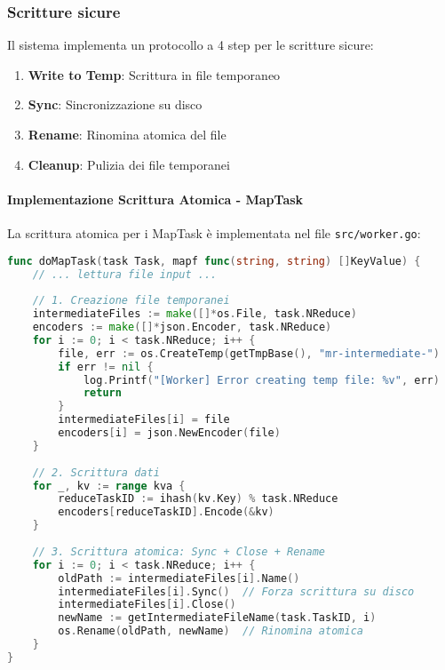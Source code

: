 \documentclass[12pt,a4paper]{article}
\begin{document}
\subsubsection{Scritture sicure}

Il sistema implementa un protocollo a 4 step per le scritture sicure:

\begin{enumerate}
\item \textbf{Write to Temp}: Scrittura in file temporaneo
\item \textbf{Sync}: Sincronizzazione su disco
\item \textbf{Rename}: Rinomina atomica del file
\item \textbf{Cleanup}: Pulizia dei file temporanei
\end{enumerate}

\paragraph{Implementazione Scrittura Atomica - MapTask}

La scrittura atomica per i MapTask è implementata nel file \texttt{src/worker.go}:

\begin{lstlisting}[language=Go, caption=Scrittura atomica MapTask]
func doMapTask(task Task, mapf func(string, string) []KeyValue) {
    // ... lettura file input ...
    
    // 1. Creazione file temporanei
    intermediateFiles := make([]*os.File, task.NReduce)
    encoders := make([]*json.Encoder, task.NReduce)
    for i := 0; i < task.NReduce; i++ {
        file, err := os.CreateTemp(getTmpBase(), "mr-intermediate-")
        if err != nil {
            log.Printf("[Worker] Error creating temp file: %v", err)
            return
        }
        intermediateFiles[i] = file
        encoders[i] = json.NewEncoder(file)
    }
    
    // 2. Scrittura dati
    for _, kv := range kva {
        reduceTaskID := ihash(kv.Key) % task.NReduce
        encoders[reduceTaskID].Encode(&kv)
    }
    
    // 3. Scrittura atomica: Sync + Close + Rename
    for i := 0; i < task.NReduce; i++ {
        oldPath := intermediateFiles[i].Name()
        intermediateFiles[i].Sync()  // Forza scrittura su disco
        intermediateFiles[i].Close()
        newName := getIntermediateFileName(task.TaskID, i)
        os.Rename(oldPath, newName)  // Rinomina atomica
    }
}
\end{lstlisting}
\end{document}
